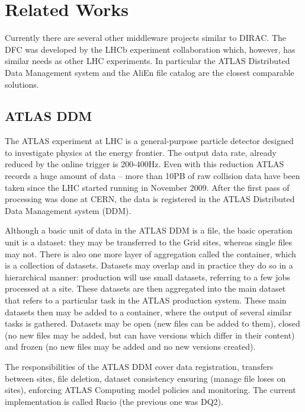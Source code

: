 \chapter{Related Works}
\label{chap:relwork}

Currently there are several other middleware projects similar to DIRAC. The DFC was developed by the LHCb experiment collaboration which, however, has similar needs as other LHC experiments. In particular the ATLAS
Distributed Data Management system and the AliEn file catalog are the closest comparable solutions.


\section{ATLAS DDM}
The ATLAS experiment at LHC is a general-purpose particle detector designed to investigate physics at the energy
frontier. The output data rate, already reduced by the online trigger is  200-400Hz. Even with this reduction 
ATLAS records a huge amount of data – more than 10PB of raw collision data have been taken since the LHC
started running in November 2009. After the first pass of processing was done at CERN, the data is registered in 
the ATLAS Distributed Data Management system (DDM)\cite{ATLASDDM1}.	

Although a basic unit of data in the ATLAS DDM is a file, the basic operation unit is a dataset: they may be
transferred to the Grid sites, whereas single files may not. There is also one more layer of aggregation called 
the container, which is a collection of datasets. Datasets may overlap and in practice they do so in a 
hierarchical manner: production will use small datasets, referring to a few jobs processed at a site. These 
datasets are then aggregated into the main dataset that refers to a particular task in the ATLAS
production system. These main datasets then may be added to a container, where the output of several 
similar tasks is gathered. Datasets may be open (new files can be added to them), closed (no new files
may be added, but can have versions which differ in their content) and frozen (no new files may be added 
and no new versions created). 

The responsibilities of the ATLAS DDM cover data registration, transfers between sites, file deletion, dataset 
consistency ensuring (manage file loses on sites), enforcing ATLAS Computing model policies and monitoring. The
current implementation is called Rucio (the previous one was DQ2).


